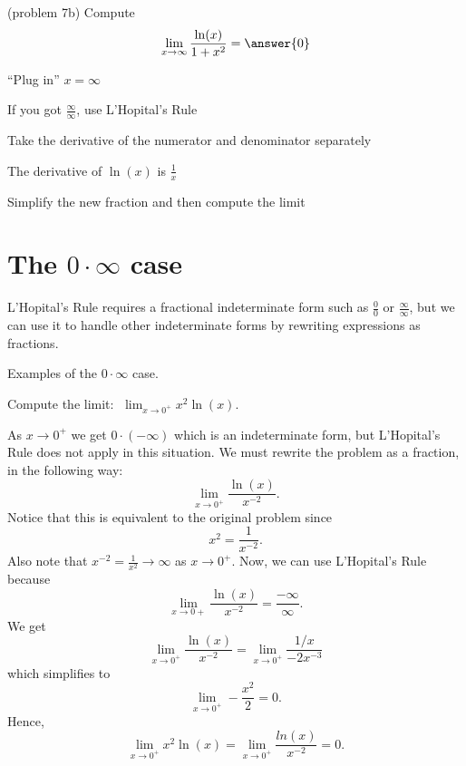\documentclass{ximera}
\begin{document}
\begin{problem}(problem 7b)
  Compute
  \[
  \lim_{x \to \infty} \frac{\ln(x)}{1 + x^2} = \answer{0}
  \]
  
    \begin{hint}
      ``Plug in'' $x=\infty$
    \end{hint}
    \begin{hint}
      If you got $\frac{\infty}{\infty}$, use L'Hopital's Rule
    \end{hint}
    \begin{hint}
      Take the derivative of the numerator and denominator separately
    \end{hint}
		\begin{hint}
		  The derivative of $\ln(x)$ is $\frac{1}{x}$
	  \end{hint}
		\begin{hint}
      Simplify the new fraction and then compute the limit
    \end{hint}
	
\end{problem}


\section{The $0 \cdot \infty$ case}

L'Hopital's Rule requires a fractional indeterminate form such as $\frac00$ or $\frac{\infty}{\infty}$, 
but we can use it to handle other indeterminate forms by rewriting expressions as fractions.

Examples of the $0\cdot\infty$ case.

\begin{example}[example 8]
Compute the limit:  $\displaystyle{\;\lim_{x \to 0^+}x^2 \ln(x)}$.

As $x\to 0^+$ we get $0 \cdot (-\infty)$ which is an indeterminate form, but L'Hopital's Rule does not apply in this situation.
We must rewrite the problem as a fraction, in the following way:
\[\lim_{x \to 0^+}\frac{\ln(x)}{x^{-2}}.\]
Notice that this is equivalent to the original problem since 
\[x^2 = \frac{1}{x^{-2}}.\]
Also note that $x^{-2} =\frac{1}{x^2} \to \infty$ as $x\to 0^+$.
Now, we can use L'Hopital's Rule because 
\[\lim_{x \to 0+}\frac{\ln(x)}{x^{-2}}= \frac{-\infty}{\infty}.\]
We get
\[\lim_{x \to 0^+}\frac{\ln(x)}{x^{-2}}= \lim_{x\to 0^+} \frac{1/x}{-2x^{-3}}\]
which simplifies to
\[\lim_{x \to 0^+}-\frac{x^2}{2}= 0.\]
Hence, 
\[\lim_{x \to 0^+} x^2 \ln(x)=\lim_{x \to 0^+}\frac{ln(x)}{x^{-2}}= 0.\]
\end{example}
\end{document}
